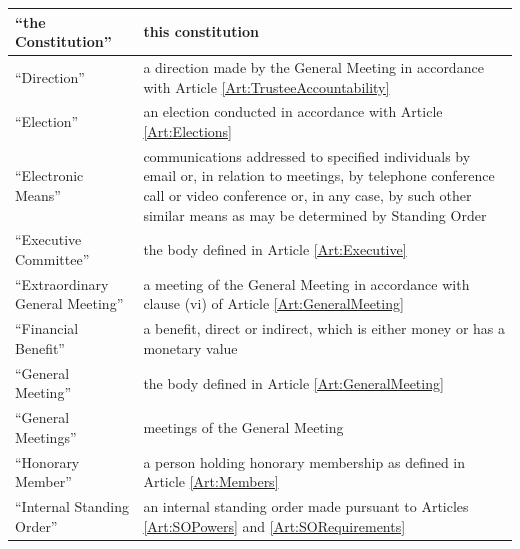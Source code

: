 \documentclass[11pt,a4paper, oneside]{memoir}
\begin{document}
\begin{enumerate}
\begin{longtable}{|p{}|p{}|}
			``the Constitution''              & this constitution                                                                                                                                                                                                                                                                                                                                                                                                                                                    \\ \hline
			``Direction''                     & a direction made by the General Meeting in accordance with Article \ref{Art:TrusteeAccountability} 
			\\ \hline
			``Election''                      & an election conducted in accordance with Article \ref{Art:Elections}                                                                                                                                                                                                                                                                                                                                                                                                               \\ \hline
			``Electronic Means''              & communications addressed to specified individuals by email or, in relation to meetings, by telephone conference call or video conference or, in any case, by such other similar means as may be determined by Standing Order 
			\\ \hline
			``Executive Committee''           & the body defined in Article \ref{Art:Executive}
			\\ \hline
			``Extraordinary General Meeting'' & a meeting of the General Meeting in accordance with clause (vi) of Article \ref{Art:GeneralMeeting}
			\\ \hline
			``Financial Benefit''             & a benefit, direct or indirect, which is either money or has a monetary value
			\\ \hline
			``General Meeting''               & the body defined in Article \ref{Art:GeneralMeeting} 
			\\ \hline
			``General Meetings'' & meetings of the General Meeting
			\\ \hline
			``Honorary Member''               & a person holding honorary membership as defined in Article \ref{Art:Members}
			\\ \hline
			``Internal Standing Order''       & an internal standing order made pursuant to Articles \ref{Art:SOPowers} and \ref{Art:SORequirements}

\end{longtable}
\end{enumerate}
\end{document}
